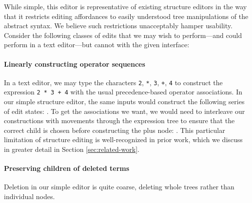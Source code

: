 While simple, this editor is representative of existing structure
editors in the way that it restricts editing affordances to easily
understood tree manipulations of the abstract syntax.
We believe such restrictions unacceptably hamper usability.
Consider the following classes of edits that we may wish to
perform---and could perform in a text editor---but cannot with the
given interface:

\paragraph{Linearly constructing operator sequences}
In a text editor, we may type the characters \texttt{2}, \texttt{*},
\texttt{3}, \texttt{+}, \texttt{4}
to construct the expression \texttt{2 * 3 + 4} with
the usual precedence-based operator associations.
In our simple structure editor, the same inputs would construct
the following series of edit states: .
To get the associations we want, we would need to interleave
our constructions with movements through the expression tree
to ensure that the correct child is chosen before constructing
the plus node: .
This particular limitation of structure editing is well-recognized
in prior work, which we discuss in greater detail in Section
\ref{sec:related-work}.

\paragraph{Preserving children of deleted terms}
Deletion in our simple editor is quite coarse, deleting whole
trees rather than individual nodes.


